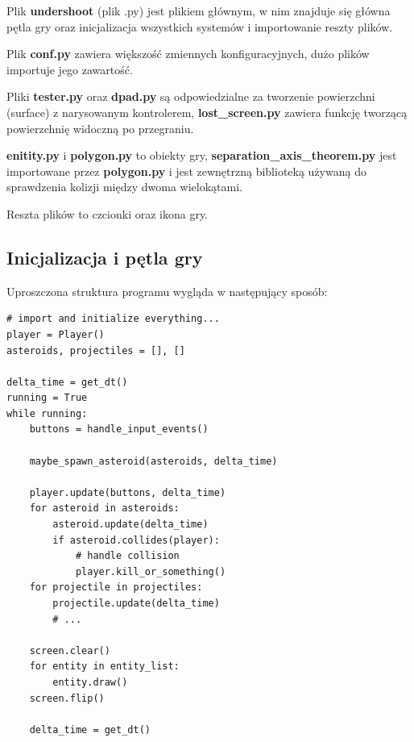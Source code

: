 \documentclass[12pt,a4paper]{article}
\begin{document}

\vspace{\baselineskip}
\noindent Plik \textbf{undershoot} (plik .py) jest plikiem głównym, w nim znajduje się główna pętla gry oraz inicjalizacja wszystkich systemów i importowanie reszty plików.
\vspace{\baselineskip}

\noindent Plik \textbf{conf.py} zawiera większość zmiennych konfiguracyjnych, dużo plików importuje jego zawartość.

\vspace{\baselineskip}
\noindent Pliki \textbf{tester.py} oraz \textbf{dpad.py} są odpowiedzialne za tworzenie powierzchni (surface) z narysowanym kontrolerem, \textbf{lost\_screen.py} zawiera funkcję tworzącą powierzchnię widoczną po przegraniu.

\vspace{\baselineskip}
\noindent \textbf{enitity.py} i \textbf{polygon.py} to obiekty gry, \textbf{separation\_axis\_theorem.py} jest importowane przez \textbf{polygon.py} i jest zewnętrzną biblioteką używaną do sprawdzenia kolizji między dwoma wielokątami.

\vspace{\baselineskip}
\noindent Reszta plików to czcionki oraz ikona gry.
  \newpage

  \subsection{Inicjalizacja i pętla gry}
  Uproszczona struktura programu wygląda w następujący sposób:
  
\begin{verbatim}
# import and initialize everything...
player = Player()
asteroids, projectiles = [], []

delta_time = get_dt()
running = True
while running:
    buttons = handle_input_events()

    maybe_spawn_asteroid(asteroids, delta_time)

    player.update(buttons, delta_time)
    for asteroid in asteroids:
        asteroid.update(delta_time)
        if asteroid.collides(player):
            # handle collision
            player.kill_or_something()
    for projectile in projectiles:
        projectile.update(delta_time)
        # ...

    screen.clear()
    for entity in entity_list:
        entity.draw()
    screen.flip()
    
    delta_time = get_dt()
\end{verbatim}
\end{document}
